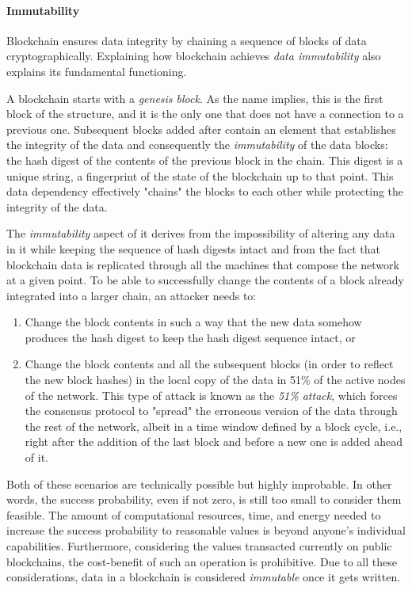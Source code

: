 \documentclass[../access.tex]{subfiles}
\begin{document}
        \paragraph{Immutability}
            Blockchain ensures data integrity by chaining a sequence of blocks of data cryptographically. Explaining how blockchain achieves \textit{data immutability} also explains its fundamental functioning.
            \par
            A blockchain starts with a \textit{genesis block}. As the name implies, this is the first block of the structure, and it is the only one that does not have a connection to a previous one. Subsequent blocks added after contain an element that establishes the integrity of the data and consequently the \textit{immutability} of the data blocks: the hash digest of the contents of the previous block in the chain. This digest is a unique string, a fingerprint of the state of the blockchain up to that point. This data dependency effectively "chains" the blocks to each other while protecting the integrity of the data.
            \par
            The \textit{immutability} aspect of it derives from the impossibility of altering any data in it while keeping the sequence of hash digests intact and from the fact that blockchain data is replicated through all the machines that compose the network at a given point. To be able to successfully change the contents of a block already integrated into a larger chain, an attacker needs to:

            \begin{enumerate}
                \item {Change the block contents in such a way that the new data somehow produces the hash digest to keep the hash digest sequence intact, or}
                \item {Change the block contents and all the subsequent blocks (in order to reflect the new block hashes) in the local copy of the data in 51\% of the active nodes of the network. This type of attack is known as the \textit{51\% attack}, which forces the consensus protocol to "spread" the erroneous version of the data through the rest of the network, albeit in a time window defined by a block cycle, i.e., right after the addition of the last block and before a new one is added ahead of it.}
            \end{enumerate}

            Both of these scenarios are technically possible but highly improbable. In other words, the success probability, even if not zero, is still too small to consider them feasible. The amount of computational resources, time, and energy needed to increase the success probability to reasonable values is beyond anyone's individual capabilities. Furthermore, considering the values transacted currently on public blockchains, the cost-benefit of such an operation is prohibitive. Due to all these considerations, data in a blockchain is considered \textit{immutable} once it gets written.
    
\end{document}
